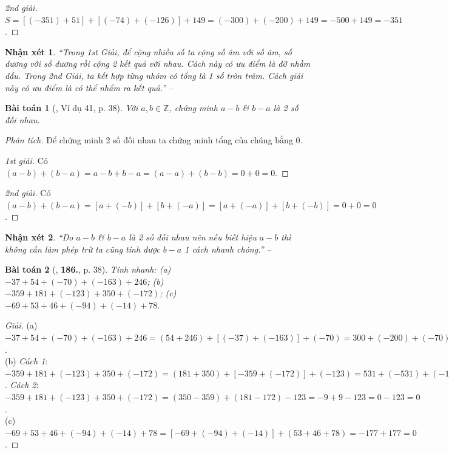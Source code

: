 \documentclass{article}
\numberwithin{equation}{section}
\newtheorem{baitoan}{Bài toán}
\newtheorem{nhanxet}{Nhận xét}[section]
\begin{document}
\begin{proof}[2nd giải]
	$S = [(-351) + 51] + [(-74) + (-126)] + 149 = (-300) + (-200) + 149 = -500 + 149 = -351$.
\end{proof}

\begin{nhanxet}
	``Trong 1st Giải, để cộng nhiều số ta cộng số âm với số âm, số dương với số dương rồi cộng 2 kết quả với nhau. Cách này có ưu điểm là đỡ nhầm dấu. Trong 2nd Giải, ta kết hợp từng nhóm có tổng là 1 số tròn trăm. Cách giải này có ưu điểm là có thể nhẩm ra kết quả.'' -- \cite[p. 37]{Tuyen_Toan_6}
\end{nhanxet}

\begin{baitoan}[\cite{Tuyen_Toan_6}, Ví dụ 41, p. 38]
	Với $a,b\in\mathbb{Z}$, chứng minh $a - b$ \& $b - a$ là 2 số đối nhau.
\end{baitoan}
\noindent\textit{Phân tích.} Để chứng minh 2 số đối nhau ta chứng minh tổng của chúng bằng $0$.
 
\begin{proof}[1st giải]
	Có $(a - b) + (b - a) = a - b + b - a = (a - a) + (b - b) = 0 + 0 = 0$.
\end{proof}

\begin{proof}[2nd giải]
	Có $(a - b) + (b - a) = [a + (-b)] + [b + (-a)] = [a + (-a)] + [b + (-b)] = 0 + 0 = 0$.
\end{proof}

\begin{nhanxet}
	``Do $a - b$ \& $b - a$ là 2 số đối nhau nên nếu biết hiệu $a - b$ thì không cần làm phép trừ ta cũng tính được $b - a$ 1 cách nhanh chóng.'' -- \cite[p. 38]{Tuyen_Toan_6}
\end{nhanxet}

\begin{baitoan}[\cite{Tuyen_Toan_6}, \textbf{186.}, p. 38]
	Tính nhanh: (a) $-37 + 54 + (-70) + (-163) + 246$; (b) $-359 + 181 + (-123) + 350 + (-172)$; (c) $-69 + 53 + 46 + (-94) + (-14) + 78$.
\end{baitoan}

\begin{proof}[Giải]
	(a) $-37 + 54 + (-70) + (-163) + 246 = (54 + 246) + [(-37) + (-163)] + (-70) = 300 + (-200) + (-70) = 100 - 70 = 30$.\\(b) \textit{Cách 1}: $-359 + 181 + (-123) + 350 + (-172) = (181 + 350) + [-359 + (-172)] + (-123) = 531 + (-531) + (-123) = 0 - 123 = -123$. \textit{Cách 2}: $-359 + 181 + (-123) + 350 + (-172) = (350 - 359) + (181 - 172) - 123 = -9 + 9 - 123 = 0 - 123 = 0$.\\(c) $-69 + 53 + 46 + (-94) + (-14) + 78 = [-69 + (-94) + (-14)] + (53 + 46 + 78) = -177 + 177 = 0$.
\end{proof}
\end{document}

